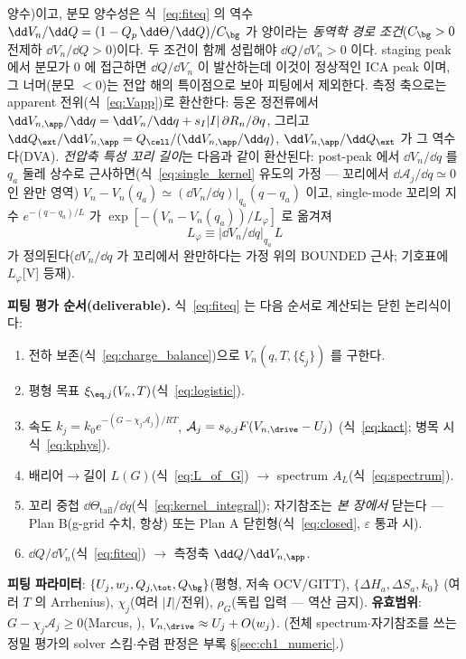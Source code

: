 양수)이고, 분모 양수성은 식~\eqref{eq:fiteq} 의 역수 $\dd V_n/\dd Q=(1-Q_p\,\dd\Theta/\dd Q)/C_\bg$ 가
양이라는 \emph{동역학 경로 조건}($C_\bg>0$ 전제하 $\dd V_n/\dd Q>0$)이다. 두 조건이 함께 성립해야
$\dd Q/\dd V_n>0$ 이다. staging peak 에서 분모가
$0$ 에 접근하면 $\dd Q/\dd V_n$ 이 발산하는데 이것이 정상적인 ICA peak 이며, 그 너머(분모 $<0$)는 전압 해의
특이점으로 보아 피팅에서 제외한다. 측정 축으로는
apparent 전위(식~\eqref{eq:Vapp})로 환산한다: 등온 정전류에서 $\dd V_{n,\app}/\dd q=\dd V_n/\dd q+
s_I|I|\,\partial R_n/\partial q$, 그리고 $\dd Q_\ext/\dd V_{n,\app}=Q_\cell/(\dd V_{n,\app}/\dd q)$,
$\dd V_{n,\app}/\dd Q_\ext$ 가 그 역수다(DVA). \emph{전압축 특성 꼬리 길이}는 다음과 같이 환산된다: post-peak 에서
$\dd V_n/\dd q$ 를 $q_a$ 둘레 상수로 근사하면(식~\eqref{eq:single_kernel} 유도의 가정 — 꼬리에서
$\dd\mathcal A_j/\dd q\simeq0$ 인 완만 영역) $V_n-V_n(q_a)\simeq(\dd V_n/\dd q)|_{q_a}(q-q_a)$ 이고,
single-mode 꼬리의 지수 $e^{-(q-q_a)/L}$ 가 $\exp[-(V_n-V_n(q_a))/L_\varphi]$ 로 옮겨져
\begin{equation}
L_\varphi\equiv\big|\dd V_n/\dd q\big|_{q_a}\,L
\label{eq:Lphi}
\end{equation}
가 정의된다($\dd V_n/\dd q$ 가 꼬리에서 완만하다는 가정 위의 BOUNDED 근사; 기호표에 $L_\varphi$[V] 등재).

\textbf{피팅 평가 순서(deliverable).} 식~\eqref{eq:fiteq} 는 다음 순서로 계산되는 닫힌 논리식이다:
\begin{enumerate}[label=\textbf{S\arabic*.},leftmargin=2.4em]
\item 전하 보존(식~\eqref{eq:charge_balance})으로 $V_n(q,T,\{\xi_j\})$ 를 구한다.
\item 평형 목표 $\xi_{\eq,j}(V_n,T)$(식~\eqref{eq:logistic}).
\item 속도 $k_j=k_0 e^{-(G-\chi_j\mathcal A_j)/RT}$, $\mathcal A_j=s_{\phi,j}F(V_{n,\drive}-U_j)$
  (식~\eqref{eq:kact}; 병목 시 식~\eqref{eq:kphys}).
\item 배리어$\to$길이 $L(G)$(식~\eqref{eq:L_of_G}) $\to$ spectrum $A_L$(식~\eqref{eq:spectrum}).
\item 꼬리 중첩 $\dd\Theta_\mathrm{tail}/\dd q$(식~\eqref{eq:kernel_integral}); 자기참조는 \emph{본 장에서} 닫는다 —
  Plan B(g-grid 수치, 항상) 또는 Plan A 닫힌형(식~\eqref{eq:closed}, $\varepsilon$ 통과 시).
\item $\dd Q/\dd V_n$(식~\eqref{eq:fiteq}) $\to$ 측정축 $\dd Q/\dd V_{n,\app}$.
\end{enumerate}
\textbf{피팅 파라미터}: $\{U_j,w_j,Q_{j,\tot},Q_\bg\}$(평형, 저속 OCV/GITT), $\{\Delta H_a,\Delta S_a,k_0\}$
(여러 $T$ 의 Arrhenius), $\chi_j$(여러 $|I|$/전위), $\rho_G$(독립 입력 — 역산 금지). \textbf{유효범위}:
$G-\chi_j\mathcal A_j\ge0$(Marcus, ), $V_{n,\drive}\approx U_j+O(w_j)$. (전체 spectrum$\cdot$자기참조를
쓰는 정밀 평가의 solver 스킴$\cdot$수렴 판정은 부록 \S\ref{sec:ch1_numeric}.)

